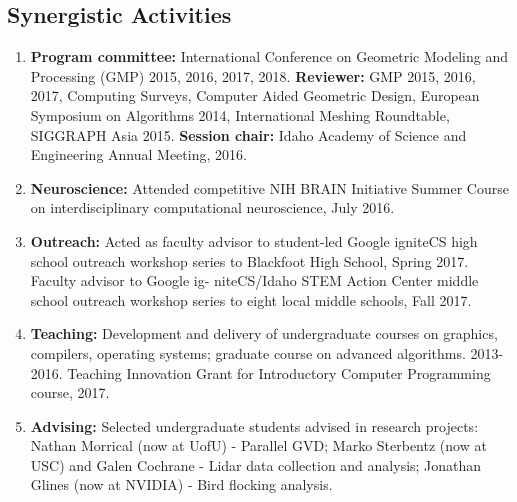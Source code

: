 \documentclass[svgnames,12pt]{article}
\newenvironment{tightenumerate}{
\begin{enumerate}
  \setlength{\itemsep}{1pt}
  \setlength{\parskip}{0pt}
  \setlength{\parsep}{0pt}
}{\end{enumerate}
}
\begin{document}
\subsection*{Synergistic Activities}
\begin{tightenumerate}
\item \textbf{Program committee:} International Conference on Geometric Modeling and Processing (GMP) 2015, 2016, 2017, 2018. \textbf{Reviewer:} GMP 2015, 2016, 2017, Computing Surveys, Computer Aided Geometric Design, European Symposium on Algorithms 2014, International Meshing Roundtable, SIGGRAPH Asia 2015. \textbf{Session chair:} Idaho Academy of Science and Engineering Annual Meeting, 2016.
\item \textbf{Neuroscience:} Attended competitive NIH BRAIN Initiative Summer Course on interdisciplinary computational neuroscience, July 2016.
\item \textbf{Outreach:} Acted as faculty advisor to student-led Google igniteCS high school outreach workshop series to Blackfoot High School, Spring 2017. Faculty advisor to Google ig- niteCS/Idaho STEM Action Center middle school outreach workshop series to eight local middle schools, Fall 2017.
\item \textbf{Teaching:} Development and delivery of undergraduate courses on graphics, compilers, operating systems; graduate course on advanced algorithms. 2013-2016. Teaching Innovation Grant for Introductory Computer Programming course, 2017.
\item \textbf{Advising:} Selected undergraduate students advised in research projects: Nathan Morrical (now at UofU) - Parallel GVD; Marko Sterbentz (now at USC) and Galen Cochrane - Lidar data collection and analysis; Jonathan Glines (now at NVIDIA) - Bird flocking analysis.
\end{tightenumerate}
\end{document}
